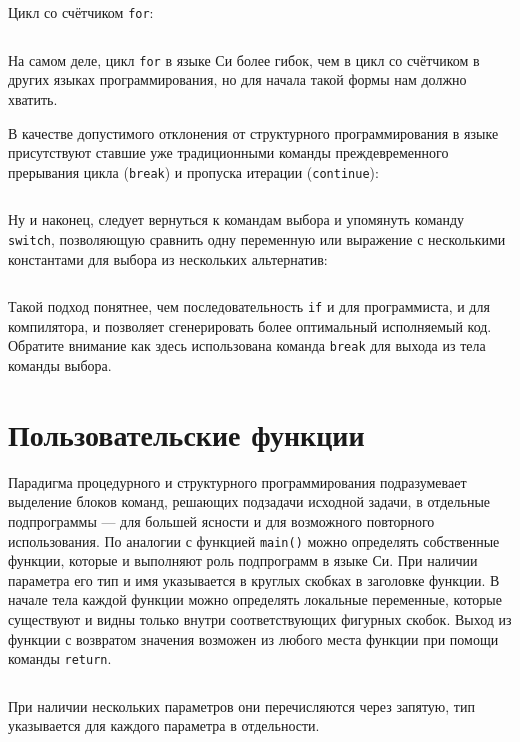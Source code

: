 \zzneedspace
Цикл со счётчиком \texttt{for}:
%
\inputminted{c}{samples/04_for.c}

На самом деле, цикл \texttt{for} в языке Си более гибок, чем в цикл со
счётчиком в других языках программирования, но для начала такой формы
нам должно хватить.

В качестве допустимого отклонения от структурного программирования в языке
присутствуют ставшие уже традиционными команды преждевременного прерывания
цикла (\texttt{break}) и пропуска итерации (\texttt{continue}):
\zzneedspace
\inputminted{c}{samples/05_break.c}

\zzneedspace
Ну и наконец, следует вернуться к командам выбора и упомянуть команду
\verb|switch|, позволяющую сравнить одну переменную или выражение
с несколькими константами для выбора из нескольких альтернатив:
%
\inputminted{c}{samples/06_switch.c}

Такой подход понятнее, чем последовательность \texttt{if} и для программиста,
и для компилятора, и  позволяет сгенерировать более оптимальный исполняемый код.
Обратите внимание как здесь использована команда \texttt{break} для выхода из
тела команды выбора.


\section{Пользовательские функции}

Парадигма процедурного и структурного программирования подразумевает выделение
блоков команд, решающих подзадачи исходной задачи, в отдельные подпрограммы --- для
большей ясности и для возможного повторного использования. По аналогии с
функцией \texttt{main()} можно определять собственные функции, которые и
выполняют роль подпрограмм в языке Си. При наличии параметра его тип и имя
указывается в круглых скобках в заголовке функции. В начале тела каждой
функции можно определять локальные переменные, которые существуют и видны
только внутри соответствующих фигурных скобок. Выход из функции с возвратом
значения возможен из любого места функции при помощи команды \texttt{return}.
%
\inputminted{c}{samples/factorial.c}

При наличии нескольких параметров они перечисляются через запятую, тип
указывается для каждого параметра в отдельности.
%
\inputminted{c}{samples/power.c}

